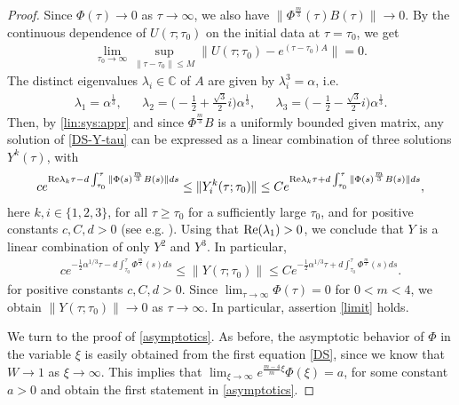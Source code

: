 \documentclass{article}%
\renewcommand{\Re}{{\rm Re}}
\newcommand{\alp}{\alpha}
\newcommand{\lam}{\lambda}
\newcommand{\C}{\mathbb{C}}
\begin{document}
\begin{proof}
Since $\Phi(\tau) \to 0$ as $\tau \to \infty$, we also have 
$\|\Phi^{\frac{m}{3}}(\tau) B(\tau)\| \to 0$. By the continuous dependence of $U(\tau;\tau_{0})$ 
on the initial data at $\tau = \tau_0$, we get
\begin{align}\label{lin:sys:appr}
    \lim_{\tau_{0}\to\infty}\sup_{\| \tau-\tau_{0}\| \leq M}\| U\left( \tau;\tau_{0}\right) -e^{(\tau-\tau_{0}) A}\| =0.
  \end{align}
The distinct eigenvalues $\lam_i \in \C$ of $A$ are given by $\lam_i^3 = \alp$, i.e.
  \begin{align*}
    \lambda_1= \alp^{\frac 13}, && %
    \lambda_2= \big(-\tfrac 12 + \tfrac {\sqrt{3}}2 i \big) \alp^{\frac 13},&& %
    \lambda_3=  \big(-\tfrac 12 - \tfrac {\sqrt{3}}2 i \big) \alp^{\frac 13}.
  \end{align*}
Then, by \eqref{lin:sys:appr} and since $\Phi^{\frac m3} B$ is a uniformly bounded 
given matrix, any solution of \eqref{DS-Y-tau} can be expressed as a linear 
combination of three solutions $Y^k(\tau)$, with
\begin{align*}
 c e^{ \Re \lambda_k \tau - d \int_{\tau_0}^{\tau} \|\Phi(s) ^{\frac m3} B(s)\|ds} \leq \|Y^k_i(\tau;\tau_0)\|   \leq
 C e^{ \Re \lambda_k \tau + d \int_{\tau_0}^{\tau} \|\Phi(s)^{\frac m3}B(s)\|ds},
\end{align*}
here $k,i \in \{ 1,2,3 \}$, for all $\tau \geq \tau_0$ for a sufficiently large $\tau_0$,
and for positive constants $c,C,d > 0$ (see e.g. \cite{Bellman1969}). Using that $\Re (\lam_1) > 0$, 
we conclude that $Y$ is a linear combination of only $Y^2$ and $Y^3$. 
In particular,
\begin{align}\label{est:Y}
 c e^{ - \frac 12 \alp^{1/3}  \tau - d \int_{\tau_0}^{\tau} \Phi^{\frac m3}(s) ds} \leq \|Y(\tau;\tau_0)\|   \leq C
 e^{ - \frac 12 \alp^{1/3}  \tau + d \int_{\tau_0}^{\tau} \Phi^{\frac m3}(s) ds}.
\end{align}
for positive constants $c,C,d > 0$. Since $\lim_{\tau\to\infty}\Phi(\tau)=0$
 for $0 < m < 4$, we obtain $\|Y(\tau;\tau_0)\|\to 0$ as $\tau\to \infty$. 
In particular, assertion \eqref{limit} holds.

\medskip

We turn to the proof of \eqref{asymptotics}. As before, the asymptotic behavior 
of $\Phi$ in the variable $\xi$ is easily obtained from the first equation 
\eqref{DS}, since we know that $W\to 1$ as $\xi\to\infty$. This implies that 
$\lim_{\xi\to\infty} e^{\frac{m-4}{m}\xi} \Phi(\xi)= a$, for some constant $a > 0$ and obtain
 the first statement in \eqref{asymptotics}.


\end{proof}
\end{document}
